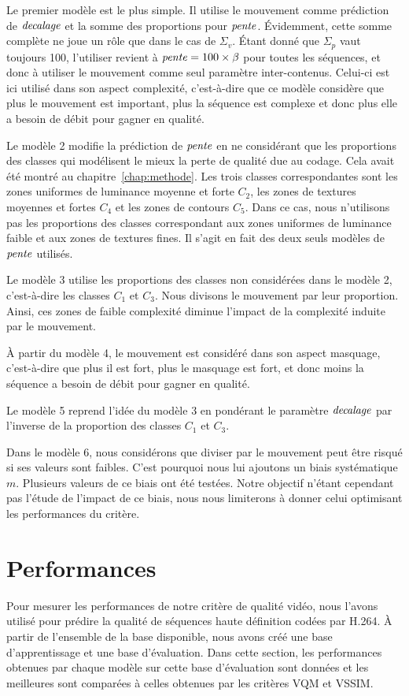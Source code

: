 Le premier modèle est le plus simple. Il utilise le mouvement comme prédiction de $\mathit{decalage}$ et la somme des proportions pour $\mathit{pente}$. Évidemment, cette somme complète ne joue un rôle que dans le cas de $\Sigma_v$. Étant donné que $\Sigma_p$ vaut toujours 100, l'utiliser revient à $\mathit{pente} = \text{100}\times\beta$ pour toutes les séquences, et donc à utiliser le mouvement comme seul paramètre inter-contenus. Celui-ci est ici utilisé dans son aspect complexité, c'est-à-dire que ce modèle considère que plus le mouvement est important, plus la séquence est complexe et donc plus elle a besoin de débit pour gagner en qualité.

Le modèle 2 modifie la prédiction de $\mathit{pente}$ en ne considérant que les proportions des classes qui modélisent le mieux la perte de qualité due au codage. Cela avait été montré au chapitre~\ref{chap:methode}. Les trois classes correspondantes sont les zones uniformes de luminance moyenne et forte $C_2$, les zones de textures moyennes et fortes $C_4$ et les zones de contours $C_5$. Dans ce cas, nous n'utilisons pas les proportions des classes correspondant aux zones uniformes de luminance faible et aux zones de textures fines. Il s'agit en fait des deux seuls modèles de $\mathit{pente}$ utilisés.

Le modèle 3 utilise les proportions des classes non considérées dans le modèle 2, c'est-à-dire les classes $C_1$ et $C_3$. Nous divisons le mouvement par leur proportion. Ainsi, ces zones de faible complexité diminue l'impact de la complexité induite par le mouvement.

À partir du modèle 4, le mouvement est considéré dans son aspect masquage, c'est-à-dire que plus il est fort, plus le masquage est fort, et donc moins la séquence a besoin de débit pour gagner en qualité.

Le modèle 5 reprend l'idée du modèle 3 en pondérant le paramètre $\mathit{decalage}$ par l'inverse de la proportion des classes $C_1$ et $C_3$.

Dans le modèle 6, nous considérons que diviser par le mouvement peut être risqué si ses valeurs sont faibles. C'est pourquoi nous lui ajoutons un biais systématique $m$. Plusieurs valeurs de ce biais ont été testées. Notre objectif n'étant cependant pas l'étude de l'impact de ce biais, nous nous limiterons à donner celui optimisant les performances du critère.


\section{Performances}
Pour mesurer les performances de notre critère de qualité vidéo, nous l'avons utilisé pour prédire la qualité de séquences haute définition codées par H.264. À partir de l'ensemble de la base disponible, nous avons créé une base d'apprentissage et une base d'évaluation. Dans cette section, les performances obtenues par chaque modèle sur cette base d'évaluation sont données et les meilleures sont comparées à celles obtenues par les critères VQM et VSSIM.

